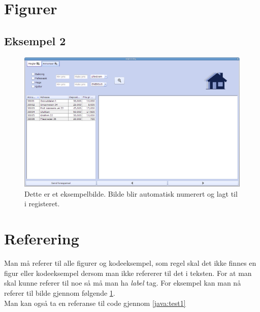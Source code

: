 \section{Figurer}
\subsection{Eksempel 2}
\begin{figure}[ht]
 \includegraphics[width=\textwidth,height=\textheight,keepaspectratio]{./img/latex_bruksanvisning/1.png}
 \caption{Dette er et eksempelbilde. Bilde blir automatisk numerert og lagt til i registeret.}
 \label{fig:hovedvindu}
\end{figure}

\section{Referering}
Man må referer til alle figurer og kodeeksempel, som regel skal det ikke finnes en figur eller kodeeksempel dersom man ikke refererer til det i teksten. For at man skal kunne referer til noe så må man ha \textit{label} tag. For eksempel kan man nå referer til bilde gjennom følgende \ref{fig:hovedvindu}. \\
Man kan også ta en referanse til code gjennom \ref{java:test1}

